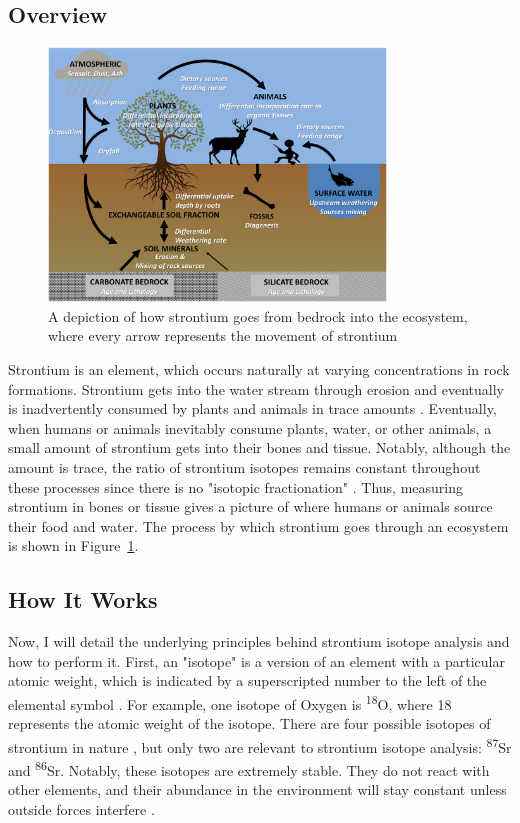 \documentclass[a4paper, 12pt]{article}
\begin{document}
\subsection{Overview}
\begin{figure}[htbp]
    \centering
    \includegraphics[width=0.8\textwidth]{strontium_process.jpg}
    \caption{A depiction of how strontium goes from bedrock into the ecosystem, where every arrow
        represents the movement of strontium \citep{bataille2020}}
    \label{fig:strontium_process}
\end{figure}

Strontium is an element, which occurs naturally at varying concentrations in rock formations.
Strontium gets into the water stream through erosion and eventually is inadvertently consumed by plants and animals in trace amounts \citep{bartelink2019}.
Eventually, when humans or animals inevitably consume plants, water, or other animals,
a small amount of strontium gets into their bones and tissue. Notably, although the amount is trace, the
ratio of strontium isotopes remains constant throughout these processes since there is no "isotopic fractionation" \citep{bartelink2019}.
Thus, measuring strontium in bones or tissue gives a picture of where humans or animals source their food and water.
The process by which strontium goes through an ecosystem is shown in Figure~\ref{fig:strontium_process}.

\subsection{How It Works}

Now, I will detail the underlying principles behind strontium isotope analysis
and how to perform it.
First, an "isotope" is a version of an element with a particular atomic weight,
which is indicated by a superscripted number to the left of the elemental symbol \citep{Meave60_2015}.
For example, one isotope of Oxygen is \textsuperscript{18}O, where 18 represents
the atomic weight of the isotope. There are four possible isotopes of strontium in
nature \citep{holt2021}, but only two are relevant to strontium isotope analysis: \textsuperscript{87}Sr and \textsuperscript{86}Sr.
Notably, these isotopes are extremely stable. They do not react with other elements,
and their abundance in the environment will stay constant unless outside forces interfere \citep{Long1998}.
\end{document}
